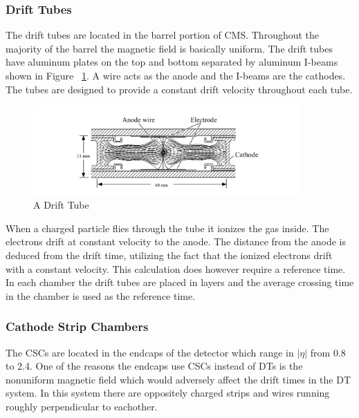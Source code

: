 \newpage

\subsubsection{Drift Tubes}

The drift tubes are located in the barrel portion of CMS. Throughout the majority of the barrel the magnetic field is basically uniform. The drift tubes have aluminum plates on the top and bottom separated by aluminum I-beams shown in Figure ~\ref{fig:dt}. A wire acts as the anode and the I-beams are the cathodes. The tubes are designed to provide a constant drift velocity throughout each tube.

\begin{figure}[h!]
  \centering
  \includegraphics[width=4in]{images/DT.png}
  \caption
   {A Drift Tube \cite{mutdr}}
  \label{fig:dt}
\end{figure}

When a charged particle flies through the tube it ionizes the gas inside. The electrons drift at constant velocity to the anode. The distance from the anode is deduced from the drift time, utilizing the fact that the ionized electrons drift with a constant velocity. This calculation does however require a reference time. In each chamber the drift tubes are placed in layers and the average crossing time in the chamber is used as the reference time.

\subsubsection{Cathode Strip Chambers}

The CSCs are located in the endcaps of the detector which range in $|\eta|$ from 0.8 to 2.4. One of the reasons the endcaps use CSCs instead of DTs is the nonuniform magnetic field which would adversely affect the drift times in the DT system. In this system there are oppositely charged strips and wires running roughly perpendicular to eachother.


